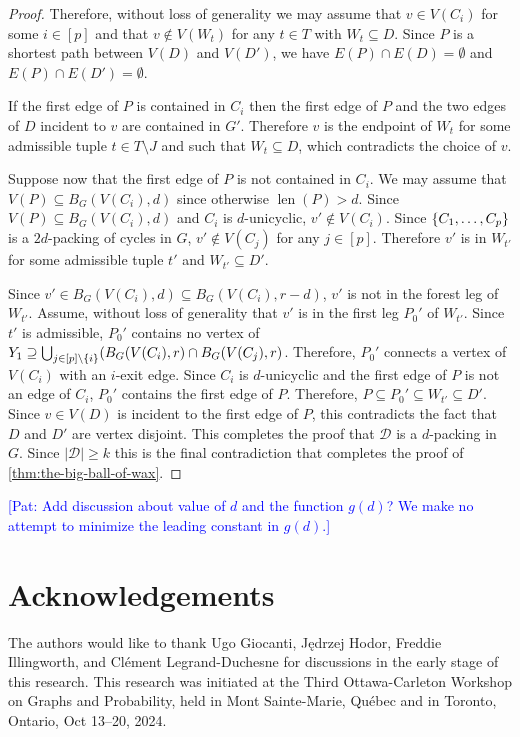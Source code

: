 \documentclass{patmorin}
\newcommand{\pat}[1]{\textcolor{Blue}{[Pat: #1]}}
\DeclareMathOperator{\len}{len}
\DeclarePairedDelimiter\set{\{}{\}}
\begin{document}
\begin{proof}
Therefore, without loss of generality we may assume that $v\in V(C_i)$ for some $i\in[p]$ and that $v\notin V(W_t)$ for any $t\in T$ with $W_t\subseteq D$.  Since $P$ is a shortest path between $V(D)$ and $V(D')$, we have $E(P)\cap E(D)=\emptyset$ and $E(P)\cap E(D')=\emptyset$.  

If the first edge of $P$ is contained in $C_i$ then the first edge of $P$ and the two edges of $D$ incident to $v$ are contained in $G'$.  Therefore $v$ is the endpoint of $W_t$ for some admissible tuple $t\in T\setminus J$ and such that $W_t\subseteq D$, which contradicts the choice of $v$.


Suppose now that the first edge of $P$ is not contained in $C_i$.  We may assume that $V(P)\subseteq B_G(V(C_i),d)$ since otherwise $\len(P)>d$.  Since $V(P)\subseteq B_G(V(C_i),d)$ and $C_i$ is $d$-unicyclic, $v'\not\in V(C_i)$.  Since $\set{C_1,\ldots,C_p}$ 
is a $2d$-packing of cycles in $G$, $v'\not\in V(C_j)$ for any $j\in[p]$. Therefore $v'$ is in $W_{t'}$ for some admissible tuple $t'$ and $W_{t'}\subseteq D'$.  

Since $v'\in B_G(V(C_i),d)\subseteq B_G(V(C_i),r-d)$, $v'$ is not in the forest leg of $W_{t'}$.  
Assume, without loss of generality that $v'$ is in the first leg $P_0'$ of $W_{t'}$.  
Since $t'$ is admissible, $P_0'$ contains no vertex of $Y_1\supseteq \bigcup_{j\in[p]\setminus \set{i}} (B_G(V(C_i),r)\cap B_G(V(C_j),r)$. 
Therefore, $P_0'$ connects a vertex of $V(C_i)$ with an $i$-exit edge.
Since $C_i$ is $d$-unicyclic and the first edge of $P$ is not an edge of $C_i$, $P_0'$ contains the first edge of $P$. Therefore, $P\subseteq P_0'\subseteq W_{t'}\subseteq D'$.  Since $v\in V(D)$ is incident to the first edge of $P$, this contradicts the fact that $D$ and $D'$ are vertex disjoint.
This completes the proof that $\mathcal{D}$ is a $d$-packing in $G$. Since $|\mathcal{D}|\geq k$ this is the final contradiction that completes the proof of \cref{thm:the-big-ball-of-wax}.
\end{proof}

\pat{Add discussion about value of $d$ and the function $g(d)$? We make no attempt to minimize the leading constant in $g(d)$.}


\section*{Acknowledgements}
The authors would like to thank 
Ugo Giocanti,
Jędrzej Hodor, 
Freddie Illingworth, and 
Clément Legrand-Duchesne 
for discussions in the early stage of this research.
This research was initiated at the Third Ottawa-Carleton Workshop on Graphs and Probability, held in Mont Sainte-Marie, Québec and in Toronto, Ontario, Oct 13–20, 2024.
\end{document}
